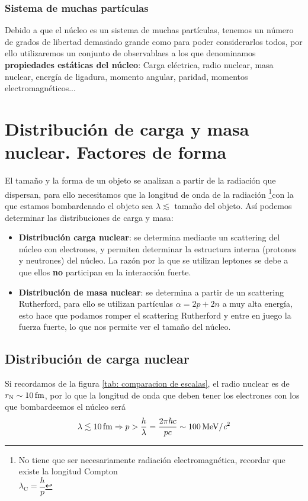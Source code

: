 \subsubsection{Sistema de muchas partículas}
Debido a que el núcleo es un sistema de muchas partículas, tenemos un número de grados de libertad demasiado grande como para poder considerarlos todos, por ello utilizaremos un conjunto de observablaes a los que denominamos \textbf{propiedades estáticas del núcleo}: Carga eléctrica, radio nuclear, masa nuclear, energía de ligadura, momento angular, paridad, momentos electromagnéticos...

\section{Distribución de carga y masa nuclear. Factores de forma}

El tamaño y la forma de un objeto se analizan a partir de la radiación que dispersan, para ello necesitamos que la longitud de onda de la radiación \footnote{No tiene que ser necesariamente radiación electromagnética, recordar que existe la longitud Compton\\ $\lambda_\mathrm{C}=\dfrac{h}{p}$}con la que estamos bombardenado el objeto sea $\lambda \lesssim $ tamaño del objeto. Así podemos determinar las distribuciones de carga y masa:
\begin{itemize}
    \item \textbf{Distribución carga nuclear}: se determina mediante un scattering del núcleo con electrones, y permiten determinar la estructura interna (protones y neutrones) del núcleo. La razón por la que se utilizan leptones se debe a que ellos \textbf{no} participan en la interacción fuerte.
    \item \textbf{Distribución de masa nuclear}: se determina a partir de un scattering Rutherford, para ello se utilizan partículas $\alpha=2p+2n$ a muy alta energía, esto hace que podamos romper el scattering Rutherford y entre en juego la fuerza fuerte, lo que nos permite ver el tamaño del núcleo.
\end{itemize}
\subsection{Distribución de carga nuclear}
Si recordamos de la figura \ref{tab: comparacion de escalas}, el radio nuclear es de $r_\mathrm{N}\sim \unit[10]{fm}$, por lo que la longitud de onda que deben tener los electrones con los que bombardeemos el núcleo será $$\lambda \lesssim \unit[10]{fm} \Rightarrow p>\dfrac{h}{\lambda}=\dfrac{2\pi \hbar c}{pc}\sim \unit[100]{MeV/\textit{c}^2}$$

